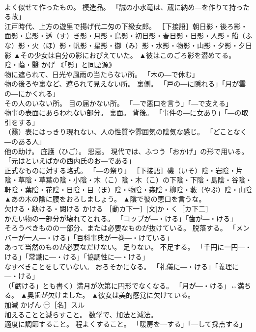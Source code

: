 \documentclass[8pt]{extreport}
\begin{document}
\begin{CJK}{UTF8}{min}
\\	よく似せて作ったもの。 模造品。 「誠の小水竜は、蔵に納め―を作りて持ったる故」 
\\	江戸時代、上方の遊里で揚げ代二匁の下級女郎。 ［下接語］朝日影・後ろ影・面影・島影・透（す）き影・月影・鳥影・初日影・春日影・日影・人影・船（ふな）影・火（ほ）影・帆影・星影・御（み）影・水影・物影・山影・夕影・夕日影	▲その少女は自分の影におびえていた。 ▲彼はこのごろ影を潜めてる。
\\	陰・蔭・翳	かげ	《「影」と同語源》 
\\	物に遮られて、日光や風雨の当たらない所。 「木の―で休む」 
\\	物の後ろや裏など、遮られて見えない所。 裏側。 「戸の―に隠れる」「月が雲の―にかくれる」 
\\	その人のいない所。 目の届かない所。 「―で悪口を言う」「―で支える」 
\\	物事の表面にあらわれない部分。 裏面。 背後。 「事件の―に女あり」「―の取引をする」 
\\	（翳）表にはっきり現れない、人の性質や雰囲気の陰気な感じ。 「どことなく―のある人」 
\\	他の助け。 庇護（ひご）。 恩恵。 現代では、ふつう「おかげ」の形で用いる。 「元はといえばかの西内氏のお―である」 
\\	正式なものに対する略式。 「―の祭り」 ［下接語］磯（いそ）陰・岩陰・片陰・草陰・草葉の陰・小陰・木（こ）陰・木（こ）の下陰・下陰・島陰・谷陰・軒陰・葉陰・花陰・日陰・目（ま）陰・物陰・森陰・柳陰・藪（やぶ）陰・山陰	▲あの木の陰に腰をおろしましょう。 ▲陰で彼の悪口を言うな。
\\	欠ける・缺ける・闕ける	かける	［動カ下一］[文]か・く［カ下二］ 
\\	かたい物の一部分が壊れてとれる。 「コップが―・ける」「歯が―・ける」 
\\	そろうべきものの一部分、または必要なものが抜けている。 脱落する。 「メンバーが一人―・ける」「百科事典が一巻―・けている」 
\\	あって当然のものが必要なだけない。 足りない。 不足する。 「千円に一円―・ける」「常識に―・ける」「協調性に―・ける」 
\\	なすべきことをしていない。 おろそかになる。 「礼儀に―・ける」「義理に―・ける」 
\\	（「虧ける」とも書く）満月が次第に円形でなくなる。 「月が―・ける」↔満ちる。	▲奥歯が欠けました。 ▲彼女は美的感覚に欠けている。
\\	加減	かげん	㊀［名］スル 
\\	加えることと減らすこと。 数学で、加法と減法。 
\\	適度に調節すること。 程よくすること。 「暖房を―する」「―して採点する」 

\end{CJK}
\end{document}
